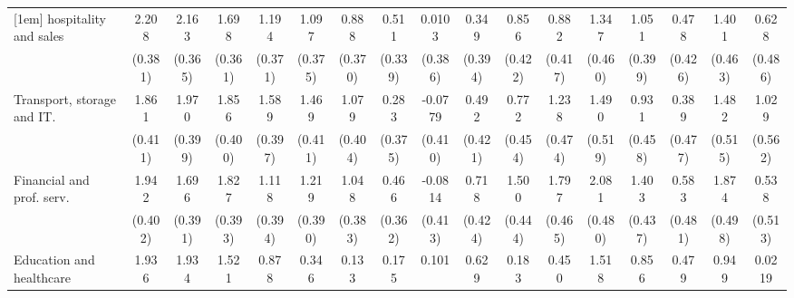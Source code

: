 {\begin{tabular}{l*{16}{c}}
[1em]
hospitality and sales&       2.208\sym{***}&       2.163\sym{***}&       1.698\sym{***}&       1.194\sym{**} &       1.097\sym{**} &       0.888\sym{*}  &       0.511         &      0.0103         &       0.349         &       0.856\sym{*}  &       0.882\sym{*}  &       1.347\sym{**} &       1.051\sym{**} &       0.478         &       1.401\sym{**} &       0.628         \\
                    &     (0.381)         &     (0.365)         &     (0.361)         &     (0.371)         &     (0.375)         &     (0.370)         &     (0.339)         &     (0.386)         &     (0.394)         &     (0.422)         &     (0.417)         &     (0.460)         &     (0.399)         &     (0.426)         &     (0.463)         &     (0.486)         \\
[1em]
Transport, storage and IT.&       1.861\sym{***}&       1.970\sym{***}&       1.856\sym{***}&       1.589\sym{***}&       1.469\sym{***}&       1.079\sym{**} &       0.283         &     -0.0779         &       0.492         &       0.772         &       1.238\sym{**} &       1.490\sym{**} &       0.931\sym{*}  &       0.389         &       1.482\sym{**} &       1.029         \\
                    &     (0.411)         &     (0.399)         &     (0.400)         &     (0.397)         &     (0.411)         &     (0.404)         &     (0.375)         &     (0.410)         &     (0.421)         &     (0.454)         &     (0.474)         &     (0.519)         &     (0.458)         &     (0.477)         &     (0.515)         &     (0.562)         \\
[1em]
Financial and prof. serv.&       1.942\sym{***}&       1.696\sym{***}&       1.827\sym{***}&       1.118\sym{**} &       1.219\sym{**} &       1.048\sym{**} &       0.466         &     -0.0814         &       0.718         &       1.500\sym{***}&       1.797\sym{***}&       2.081\sym{***}&       1.403\sym{**} &       0.583         &       1.874\sym{***}&       0.538         \\
                    &     (0.402)         &     (0.391)         &     (0.393)         &     (0.394)         &     (0.390)         &     (0.383)         &     (0.362)         &     (0.413)         &     (0.424)         &     (0.444)         &     (0.465)         &     (0.480)         &     (0.437)         &     (0.481)         &     (0.498)         &     (0.513)         \\
[1em]
Education and healthcare&       1.936\sym{***}&       1.934\sym{***}&       1.521\sym{**} &       0.878         &       0.346         &       0.133         &       0.175         &       0.101         &       0.629         &       0.183         &       0.450         &       1.518\sym{*}  &       0.856         &       0.479         &       0.949         &      0.0219         \\

\end{tabular}}
